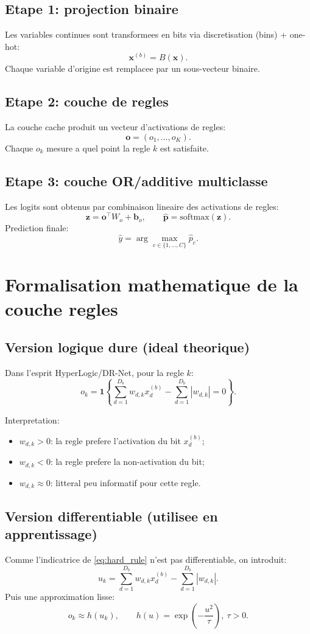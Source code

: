 \documentclass[11pt,a4paper]{article}
\begin{document}
\subsection{Etape 1: projection binaire}
Les variables continues sont transformees en bits via discretisation (bins) + one-hot:
\[
\bm{x}^{(b)}=B(\bm{x}).
\]
Chaque variable d'origine est remplacee par un sous-vecteur binaire.

\subsection{Etape 2: couche de regles}
La couche cache produit un vecteur d'activations de regles:
\[
\bm{o}=(o_1,\dots,o_K).
\]
Chaque $o_k$ mesure a quel point la regle $k$ est satisfaite.

\subsection{Etape 3: couche OR/additive multiclasse}
Les logits sont obtenus par combinaison lineaire des activations de regles:
\[
\bm{z}=\bm{o}^\top W_o + \bm{b}_o,\qquad
\hat{\bm{p}}=\text{softmax}(\bm{z}).
\]
Prediction finale:
\[
\hat{y}=\arg\max_{c\in\{1,\dots,C\}}\hat{p}_c.
\]

\section{Formalisation mathematique de la couche regles}
\subsection{Version logique dure (ideal theorique)}
Dans l'esprit HyperLogic/DR-Net, pour la regle $k$:
\begin{equation}
o_k
=\mathbf{1}\!\left\{
\sum_{d=1}^{D_b} w_{d,k}x_d^{(b)}-\sum_{d=1}^{D_b}|w_{d,k}|=0
\right\}.
\label{eq:hard_rule}
\end{equation}

Interpretation:
\begin{itemize}
    \item $w_{d,k}>0$: la regle prefere l'activation du bit $x_d^{(b)}$;
    \item $w_{d,k}<0$: la regle prefere la non-activation du bit;
    \item $w_{d,k}\approx 0$: litteral peu informatif pour cette regle.
\end{itemize}

\subsection{Version differentiable (utilisee en apprentissage)}
Comme l'indicatrice de \eqref{eq:hard_rule} n'est pas differentiable, on introduit:
\[
u_k=\sum_{d=1}^{D_b} w_{d,k}x_d^{(b)}-\sum_{d=1}^{D_b}|w_{d,k}|.
\]
Puis une approximation lisse:
\begin{equation}
o_k \approx h(u_k),\qquad
h(u)=\exp\!\left(-\frac{u^2}{\tau}\right),\ \tau>0.
\label{eq:smooth_rule}
\end{equation}
\end{document}
